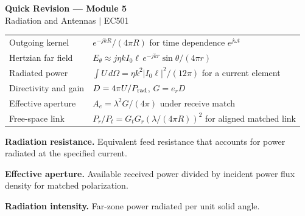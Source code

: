 \documentclass[12pt,a4paper]{article}
\renewcommand{\arraystretch}{1.45}
\begin{document}
\newpage
\begin{center}
  {\large\bfseries\color{myred} Quick Revision --- Module 5}\\[3pt]
  {\small\color{mydark} Radiation and Antennas $|$ EC501}
\end{center}
\noindent{\color{myred}\rule{\linewidth}{1.2pt}}
\begin{tcolorbox}[formulabox,title={Key Formulas at a Glance}]
\renewcommand{\arraystretch}{1.35}
\begin{tabularx}{\linewidth}{B{5.0cm}Y}
Outgoing kernel & $e^{-jkR}/(4\pi R)$ for time dependence $e^{j\omega t}$ \\[3pt]
Hertzian far field & $E_\theta\approx j\eta k I_0\ell\,e^{-jkr}\sin\theta/(4\pi r)$ \\[3pt]
Radiated power & $\int U\,d\Omega=\eta k^2|I_0\ell|^2/(12\pi)$ for a current element \\[3pt]
Directivity and gain & $D=4\pi U/P_{\rm rad}$, $G=e_r D$ \\[3pt]
Effective aperture & $A_e=\lambda^2G/(4\pi)$ under receive match \\[3pt]
Free-space link & $P_r/P_t=G_tG_r(\lambda/(4\pi R))^2$ for aligned matched link \\[3pt]
\end{tabularx}
\end{tcolorbox}
\begin{tcolorbox}[defbox,title={One-Line Definitions}]
\textbf{Radiation resistance.} Equivalent feed resistance that accounts for power radiated at the specified current.\par
\textbf{Effective aperture.} Available received power divided by incident power flux density for matched polarization.\par
\textbf{Radiation intensity.} Far-zone power radiated per unit solid angle.\par
\end{tcolorbox}
\end{document}
